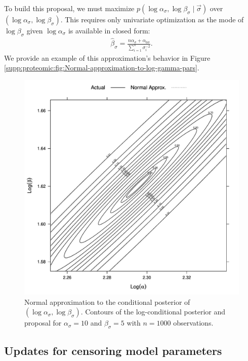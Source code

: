 To build this proposal, we must maximize $p(\log \alpha_{\sigma}, \log \beta_{\sigma} \mid \vec{\sigma})$ over $(\log \alpha_{\sigma}, \log \beta_{\sigma})$.
This requires only univariate optimization as the mode of $\log \beta_\sigma$ given $\log \alpha_\sigma$ is available in closed form:
\begin{eqnarray}
\hat{\beta}_{\sigma} = \frac{n\alpha_{\sigma} + \alpha_{0 \sigma}}{\sum_{i=1}^{n}\sigma_{i}^{-2}} .
\end{eqnarray}
We provide an example of this approximation's behavior in Figure \ref{supp:proteomic:fig:Normal-approximation-to-log-gamma-pars}.

\begin{figure}
\centering
\includegraphics[width=\textwidth]{figures/proteomics/gamma_normal_approx}

\caption{Normal approximation to the conditional posterior of $(\log \alpha_\sigma, \log \beta_\sigma)$. Contours of the log-conditional posterior and proposal for $\alpha_\sigma=10$ and $\beta_\sigma=5$ with $n=1000$ observations.\label{supp:proteomics:fig:Normal-approximation-to-log-gamma-pars}} 
\end{figure}




\subsection{Updates for censoring model parameters}


